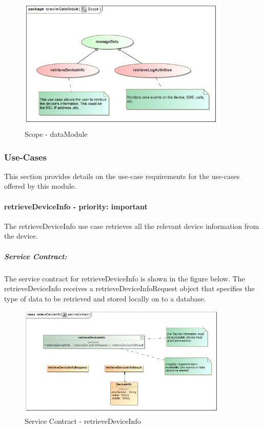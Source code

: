 \documentclass[hidelinks, 12pt, oneside]{article}
\begin{document}
		\begin{figure}[!htbp]
    		\centering
    		\includegraphics[width=0.9\textwidth]{img/scopeData.jpg}
    		\caption{Scope - dataModule}
    		\label{fig:Scope_dataModule}
		\end{figure}	
		
		
	\subsubsection{Use-Cases}
		This section provides details on the use-case requirements for the use-cases offered by this module.	
		
	\paragraph{retrieveDeviceInfo - priority: important}
		The retrieveDeviceInfo use case retrieves all the relevant device information from the device.\newline
		
		\subparagraph{Service Contract:}
		The service contract for retrieveDeviceInfo is shown in the figure below. The retrieveDeviceInfo 			receives a retrieveDeviceInfoRequest object that specifies the type of data to be retrieved and 			stored locally on to a database.
		
		
		\begin{figure}[!htbp]
    		\centering
    		\includegraphics[width=0.9\textwidth]{img/serviceContractRetrieveDeviceInfo.jpg}
    		\caption{Service Contract - retrieveDeviceInfo}
    		\label{fig:ServiceCon_retrieveDeviceInfo}
		\end{figure}
\end{document}

